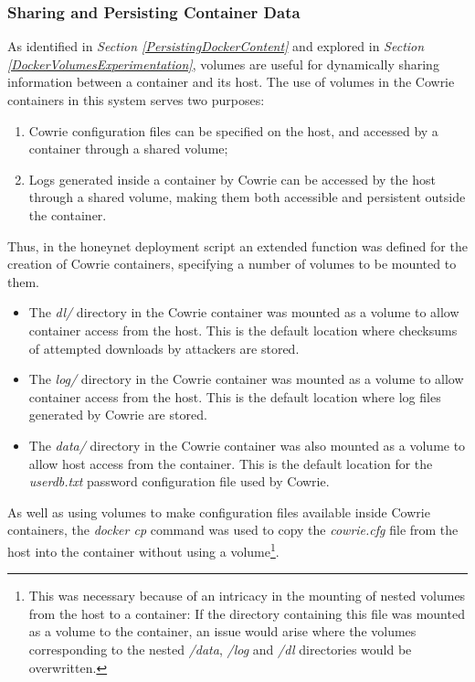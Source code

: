 \subsubsection{Sharing and Persisting Container Data}
As identified in \textit{Section \ref{PersistingDockerContent}} and explored in \textit{Section \ref{DockerVolumesExperimentation}}, volumes are useful for dynamically sharing information between a container and its host. The use of volumes in the Cowrie containers in this system serves two purposes:

\begin{enumerate}
\item Cowrie configuration files can be specified on the host, and accessed by a container through a shared volume;
\item Logs generated inside a container by Cowrie can be accessed by the host through a shared volume, making them both accessible and persistent outside the container.
\end{enumerate}

Thus, in the honeynet deployment script an extended function was defined for the creation of Cowrie containers, specifying a number of volumes to be mounted to them.

\begin{itemize}
\item The \textit{dl/} directory in the Cowrie container was mounted as a volume to allow container access from the host. This is the default location where checksums of attempted downloads by attackers are stored.
\item The \textit{log/} directory in the Cowrie container was mounted as a volume to allow container access from the host. This is the default location where log files generated by Cowrie are stored.
\item The \textit{data/} directory in the Cowrie container was also mounted as a volume to allow host access from the container. This is the default location for the \textit{userdb.txt} password configuration file used by Cowrie.
\end{itemize}

As well as using volumes to make configuration files available inside Cowrie containers, the \textit{docker cp} command was used to copy the \textit{cowrie.cfg} file from the host into the container without using a volume\footnote{This was necessary because of an intricacy in the mounting of nested volumes from the host to a container: If the directory containing this file was mounted as a volume to the container, an issue would arise where the volumes corresponding to the nested \textit{/data}, \textit{/log} and \textit{/dl} directories would be overwritten.}. 


